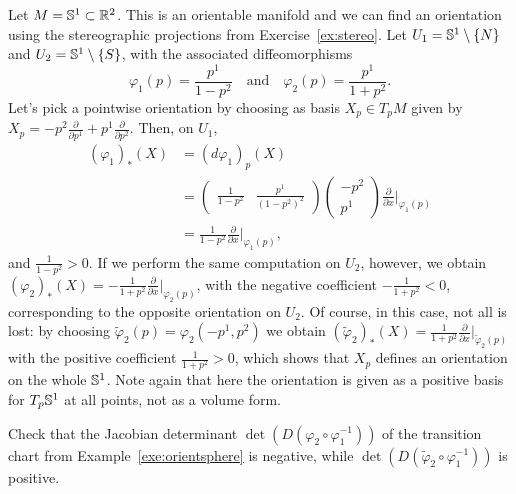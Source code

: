 \begin{example}\label{exe:orientsphere}
	Let $M = \mathbb{S}^1\subset \mathbb{R}^2$.
	This is an orientable manifold and we can find an orientation using the stereographic projections from Exercise~\ref{ex:stereo}.
	Let $U_1 = \mathbb{S}^1\setminus\{N\}$ and $U_2 = \mathbb{S}^1\setminus\{S\}$, with the associated diffeomorphisms
	\begin{equation}
		\varphi_1(p) = \frac{p^1}{1-p^2}
		\quad\mbox{and}\quad
		\varphi_2(p) = \frac{p^1}{1+p^2}.
	\end{equation}
	Let's pick a pointwise orientation by choosing as basis $X_p\in T_pM$ given by $X_p = -p^2 \frac{\partial}{\partial p^1} + p^1 \frac{\partial}{\partial p^2}$.
	Then, on $U_1$,
	\begin{align}
		(\varphi_1)_*(X) & = (d\varphi_1)_p(X)                                                \\
		                 & = \left(\begin{smallmatrix}
				                           \frac{1}{1-p^2} & \frac{p^1}{(1-p^2)^2}
			                           \end{smallmatrix}\right)
		\left(\begin{smallmatrix}
				      -p^2 \\ p^1
			      \end{smallmatrix}\right) \frac{\partial}{\partial x}\Big|_{\varphi_1(p)}        \\
		                 & = \frac{1}{1-p^2} \frac{\partial}{\partial x}\Big|_{\varphi_1(p)},
	\end{align}
	and $\frac{1}{1-p^2}>0$.
	If we perform the same computation on $U_2$, however, we obtain $(\varphi_2)_*(X) = -\frac{1}{1+p^2}\frac{\partial}{\partial x}\Big|_{\varphi_2(p)}$, with the negative coefficient $-\frac{1}{1+p^2} < 0$, corresponding to the opposite orientation on $U_2$.
	Of course, in this case, not all is lost: by choosing $\widetilde\varphi_2(p) = \varphi_2(-p^1, p^2)$ we obtain $(\widetilde\varphi_2)_*(X) = \frac{1}{1+p^2} \frac{\partial}{\partial x}\Big|_{\widetilde\varphi_2(p)}$ with the positive coefficient $\frac{1}{1+p^2} > 0$, which shows that $X_p$ defines an orientation on the whole $\mathbb{S}^1$.
	Note again that here the orientation is given as a positive basis for $T_p \mathbb{S}^1$ at all points, not as a volume form.
\end{example}

\begin{exercise}
	Check that the Jacobian determinant $\det(D(\varphi_2\circ \varphi_1^{-1}))$ of the transition chart from Example~\ref{exe:orientsphere} is negative, while $\det(D(\widetilde\varphi_2\circ \varphi_1^{-1}))$ is positive.
\end{exercise}

